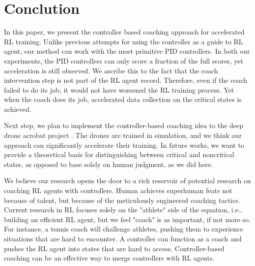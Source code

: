 \documentclass[journal]{IEEEtran}
\begin{document}
\section{Conclution}

In this paper, we present the controller based coaching approach for accelerated RL training. Unlike previous attempts for using the controller as a guide to RL agent, our method can work with the most primitive PID controllers. In both our experiments, the PID controllers can only score a fraction of the full scores, yet acceleration is still observed. We ascribe this to the fact that the coach intervention step is not part of the RL agent record. Therefore, even if the coach failed to do its job, it would not have worsened the RL training process. Yet when the coach does its job, accelerated data collection on the critical states is achieved. 

Next step, we plan to implement the controller-based coaching idea to the deep drone acrobat project \cite{Kaufmann2020DeepDA}. The drones are trained in simulation, and we think our approach can significantly accelerate their training. In future works, we want to provide a theoretical basis for distinguishing between critical and noncritical states, as opposed to base solely on human judgment, as we did here. 

We believe our research opens the door to a rich reservoir of potential research on coaching RL agents with controllers. Human achieves superhuman feats not because of talent, but because of the meticulously engineered coaching tactics. Current research in RL focuses solely on the "athlete" side of the equation, i.e., building an efficient RL agent, but we feel "coach" is as important, if not more so.  For instance, a tennis coach will challenge athletes, pushing them to experience situations that are hard to encounter. A controller can function as a coach and pushes the RL agent into states that are hard to access. Controller-based coaching can be an effective way to merge controllers with RL agents. 



\end{document}
